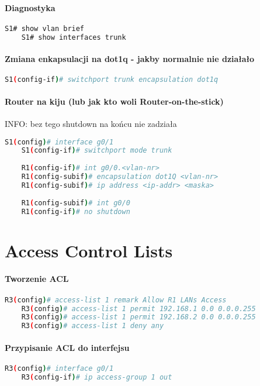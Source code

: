 \documentclass[12pt]{article}
\begin{document}
	\paragraph{Diagnostyka}
	\begin{lstlisting}[language=bash]
	S1# show vlan brief
	S1# show interfaces trunk 
	\end{lstlisting}
		
	\paragraph{Zmiana enkapsulacji na dot1q - jakby normalnie nie działało}
	\begin{lstlisting}[language=bash]
	S1(config-if)# switchport trunk encapsulation dot1q
	\end{lstlisting}
		
		
	\paragraph{Router na kiju (lub jak kto woli Router-on-the-stick)\\}
	INFO: bez tego shutdown na końcu nie zadziała
	\begin{lstlisting}[language=bash]		
	S1(config)# interface g0/1
	S1(config-if)# switchport mode trunk 
	
	R1(config-if)# int g0/0.<vlan-nr>
	R1(config-subif)# encapsulation dot1Q <vlan-nr>
	R1(config-subif)# ip address <ip-addr> <maska>
	
	R1(config-subif)# int g0/0
	R1(config-if)# no shutdown 
	\end{lstlisting}
	
\newpage

\section{Access Control Lists}
	\paragraph{Tworzenie ACL}
	\begin{lstlisting}[language=bash]
	R3(config)# access-list 1 remark Allow R1 LANs Access 
	R3(config)# access-list 1 permit 192.168.1 0.0 0.0.0.255 
	R3(config)# access-list 1 permit 192.168.2 0.0 0.0.0.255 
	R3(config)# access-list 1 deny any 
	\end{lstlisting}
	
	\paragraph{Przypisanie ACL do interfejsu}
	\begin{lstlisting}[language=bash]
	R3(config)# interface g0/1 
	R3(config-if)# ip access-group 1 out 
	\end{lstlisting}
		
\end{document}
